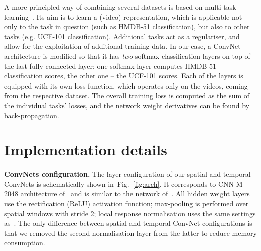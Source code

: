 \documentclass{article} \usepackage{nips14submit_e,times}
\makeatletter
\newcommand{\figref}[1]{Fig.~\ref{#1}}
\newcommand*{\eg}{e.g.\@\xspace}
\makeatother
\begin{document}
A more principled way of combining several datasets is based on multi-task learning~\cite{Collobert08}.
Its aim is to learn a (video) representation, which is applicable not only to the task in question (such as HMDB-51 classification), but also
to other tasks (\eg UCF-101 classification). Additional tasks act as a regulariser, and allow for the exploitation of additional training data.
In our case, a ConvNet architecture is modified so that it has \emph{two} softmax classification layers on
top of the last fully-connected layer: one softmax layer computes HMDB-51 classification scores, the other one -- the UCF-101 scores. Each of the layers is equipped with
its own loss function, which operates only on the videos, coming from the respective dataset. The overall training loss is computed as the sum of the individual
tasks' losses, and the network weight derivatives can be found by back-propagation.






\section{Implementation details}
\label{sec:impl}
\label{sec:impl:spatial}
\label{sec:impl:temporal}

\noindent\textbf{ConvNets configuration.}
The layer configuration of our spatial and temporal ConvNets is schematically shown in~\figref{fig:arch}.
It corresponds to CNN-M-2048 architecture of~\cite{Chatfield14} and is similar to the network of~\cite{Zeiler13}.
All hidden weight layers use the rectification (ReLU) activation function; max-pooling is performed over  spatial windows with stride 2; local response
normalisation uses the same settings as~\cite{Krizhevsky12}.
The only difference between spatial and temporal ConvNet configurations is that we removed the second normalisation layer from the latter to reduce memory consumption. 
\end{document}
